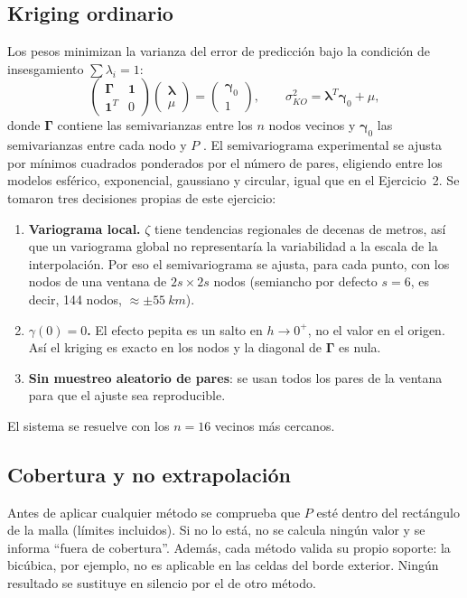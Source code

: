 \documentclass[11pt,letterpaper]{article}
\begin{document}
\subsection{Kriging ordinario}
Los pesos minimizan la varianza del error de predicción bajo la condición de
insesgamiento $\sum\lambda_i=1$:
\begin{equation}
\begin{pmatrix}\boldsymbol{\Gamma} & \mathbf{1}\\ \mathbf{1}^T & 0\end{pmatrix}
\begin{pmatrix}\boldsymbol{\lambda}\\ \mu\end{pmatrix}=
\begin{pmatrix}\boldsymbol{\gamma}_0\\ 1\end{pmatrix},
\qquad
\sigma^2_{KO}=\boldsymbol{\lambda}^T\boldsymbol{\gamma}_0+\mu,
\label{eq:ko}
\end{equation}
donde $\boldsymbol\Gamma$ contiene las semivarianzas entre los $n$ nodos vecinos y
$\boldsymbol\gamma_0$ las semivarianzas entre cada nodo y $P$ \citep{cressie1993}. El
semivariograma experimental se ajusta por mínimos cuadrados ponderados por el número de
pares, eligiendo entre los modelos esférico, exponencial, gaussiano y circular, igual que
en el Ejercicio~2. Se tomaron tres decisiones propias de este ejercicio:
\begin{enumerate}
    \item \textbf{Variograma local.} $\zeta$ tiene tendencias regionales de decenas de
    metros, así que un variograma global no representaría la variabilidad a la escala de la
    interpolación. Por eso el semivariograma se ajusta, para cada punto, con los nodos de una
    ventana de $2s\times2s$ nodos (semiancho por defecto $s=6$, es decir, 144 nodos,
    $\approx\pm\SI{55}{km}$).
    \item \textbf{$\gamma(0)=0$.} El efecto pepita es un salto en $h\to0^+$, no el valor en
    el origen. Así el kriging es exacto en los nodos y la diagonal de $\boldsymbol\Gamma$ es
    nula.
    \item \textbf{Sin muestreo aleatorio de pares}: se usan todos los pares de la ventana para
    que el ajuste sea reproducible.
\end{enumerate}
El sistema se resuelve con los $n=16$ vecinos más cercanos.

\subsection{Cobertura y no extrapolación}
Antes de aplicar cualquier método se comprueba que $P$ esté dentro del rectángulo de la
malla (límites incluidos). Si no lo está, no se calcula ningún valor y se informa
``fuera de cobertura''. Además, cada método valida su propio soporte: la bicúbica, por
ejemplo, no es aplicable en las celdas del borde exterior. Ningún resultado se sustituye en
silencio por el de otro método.
\end{document}
